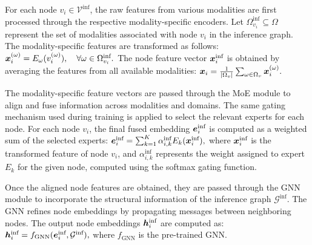 For each node \( v_i \in \mathcal{V}^{\text{inf}} \), the raw features from various modalities are first processed through the respective modality-specific encoders. Let \( \Omega_{v_i}^{\text{inf}} \subseteq \Omega \) represent the set of modalities associated with node \( v_i \) in the inference graph. The modality-specific features are transformed as follows:
\(
{\bm{x}}_i^{(\omega)} = E_{\omega}(v_i^{(\omega)}), \quad \forall \omega \in \Omega_{v_i}^{\text{inf}}.
\)
The node feature vector \( {\bm{x}}_i^{\text{inf}} \) is obtained by averaging the features from all available modalities:
\(
    {\bm{x}}_i = \frac{1}{|\Omega_v|} \sum_{\omega \in \Omega_v} {\bm{x}}_i^{(\omega)}.
\)

The modality-specific feature vectors are passed through the MoE module to align and fuse information across modalities and domains. The same gating mechanism used during training is applied to select the relevant experts for each node.
For each node \( v_i \), the final fused embedding \( {\bm{e}}_i^{\text{inf}} \) is computed as a weighted sum of the selected experts:
\(
{\bm{e}}_i^{\text{inf}} = \sum_{k=1}^{K} \alpha_{i,k}^{\text{inf}} E_k({\bm{x}}_i^{\text{inf}}),
\)
where \( {\bm{x}}_i^{\text{inf}} \) is the transformed feature of node \( v_i \), and \( \alpha_{i,k}^{\text{inf}} \) represents the weight assigned to expert \( E_k \) for the given node, computed using the softmax gating function.

Once the aligned node features are obtained, they are passed through the GNN module to incorporate the structural information of the inference graph \( \mathcal{G}^{\text{inf}} \). The GNN refines node embeddings by propagating messages between neighboring nodes. The output node embeddings \( {\bm{h}}_i^{\text{inf}} \) are computed as:
\(
{\bm{h}}_i^{\text{inf}} = f_{\text{GNN}}({\bm{e}}_i^{\text{inf}}, \mathcal{G}^{\text{inf}}),
\)
where \( f_{\text{GNN}} \) is the pre-trained GNN.
